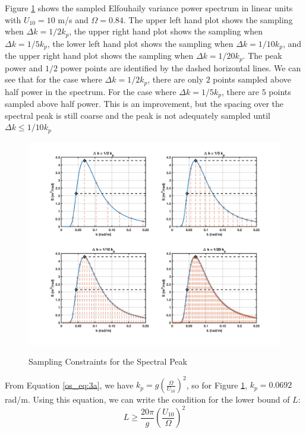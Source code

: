 Figure \ref{os_fig:6ba} shows the sampled Elfouhaily variance power spectrum in linear units with $U_{10} = 10$ m/s and $\Omega = 0.84$.  The upper left hand plot shows the sampling when $\Delta k = 1/2 k_p$, the upper right hand plot shows the sampling when $\Delta k = 1/5 k_p$, the lower left hand plot shows the sampling when $\Delta k = 1/10 k_p$, and the upper right hand plot shows the sampling when $\Delta k = 1/20 k_p$. The peak power and $1/2$ power points are identified by the dashed horizontal lines. We can see that for the case where $\Delta k = 1/2 k_p$, there are only $2$ points sampled above half power in the spectrum. For the case where $\Delta k = 1/5 k_p$, there are $5$ points sampled above half power. This is an improvement, but the spacing over the spectral peak is still coarse and the peak is not adequately sampled until $\Delta k \leq 1/10 k_p$
\begin{figure}[H]
  \begin{center}
\includegraphics[width=6in]{../media/Ocean_Surface/spectral_peak_sampling.png}
  \end{center}
  \renewcommand{\baselinestretch}{1} \small\normalsize
  \begin{quote}
    \caption[Sampling Constraints for the Spectral Peak]{Sampling Constraints for the Spectral Peak\label{os_fig:6ba}}
  \end{quote}
\end{figure}
\renewcommand{\baselinestretch}{2} \small\normalsize

From Equation \ref{os_eq:3a}, we have $k_p = g\left(\frac{\Omega}{U_{10}}\right)^2$, so for Figure \ref{os_fig:6ba}, $k_p = 0.0692$ rad/m. Using this equation, we can write the condition for the lower bound of $L$:
\begin{equation}
\label{os_eq:8o}
\boxed{L \geq \frac{20\pi}{g}\left(\frac{U_{10}}{\Omega} \right)^2}
\end{equation}

